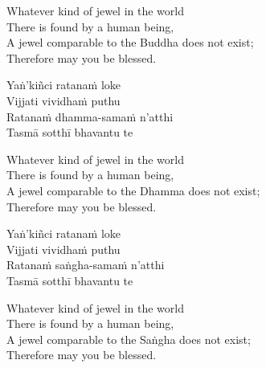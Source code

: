 \begin{english-verses}
  Whatever kind of jewel in the world\\
  There is found by a human being,\\
  A jewel comparable to the Buddha does not exist;\\
  Therefore may you be blessed.
\end{english-verses}

\begin{pali-hang-continued}
  Yaṅ'kiñci ratanaṁ loke\\
  Vijjati vividhaṁ puthu\\
  Ratanaṁ dhamma-samaṁ n'atthi\\
  Tasmā sotthī bhavantu te
\end{pali-hang-continued}

\begin{english-verses}
  Whatever kind of jewel in the world\\
  There is found by a human being,\\
  A jewel comparable to the Dhamma does not exist;\\
  Therefore may you be blessed.
\end{english-verses}

\ifninebythirteen\clearpage\fi

\begin{pali-hang-continued}
  Yaṅ'kiñci ratanaṁ loke\\
  Vijjati vividhaṁ puthu\\
  Ratanaṁ saṅgha-samaṁ n'atthi\\
  Tasmā sotthī bhavantu te
\end{pali-hang-continued}

\ifbfive\clearpage\fi

\begin{english-verses}
  Whatever kind of jewel in the world\\
  There is found by a human being,\\
  A jewel comparable to the Saṅgha does not exist;\\
  Therefore may you be blessed.
\end{english-verses}

